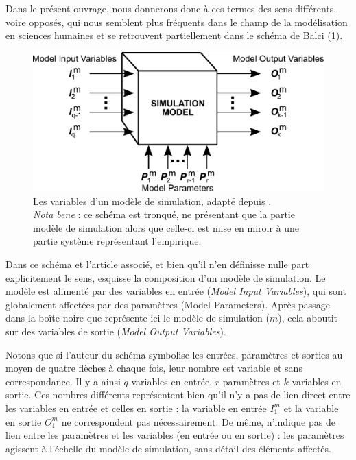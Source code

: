 Dans le présent ouvrage, nous donnerons donc à ces termes des sens différents, voire opposés, qui nous semblent plus fréquents dans le champ de la modélisation en sciences humaines et se retrouvent partiellement dans le schéma de Balci (\cref{fig:parametres-Balci}).
\begin{figure}[!h]
	\centering
	\includegraphics[width=.8\linewidth]{img/schema_parametres_balci.pdf}
	\caption[Les variables d'un modèle de simulation selon \citeauthor{balci_validation_1994}]{Les variables d'un modèle de simulation, adapté depuis \textcite[122]{balci_validation_1994}.\\
		\textit{Nota bene} : ce schéma est tronqué, ne présentant que la partie \og modèle de simulation\fg{} alors que celle-ci est mise en miroir à une partie \og système\fg{} représentant l'empirique.}
	\label{fig:parametres-Balci} 
\end{figure}

Dans ce schéma et l'article associé, et bien qu'il n'en définisse nulle part explicitement le sens, \citeauthor{balci_validation_1994} esquisse la composition d'un modèle de simulation.
Le modèle est alimenté par des variables en entrée (\textit{Model Input Variables}), qui sont globalement affectées par des paramètres (Model Parameters).
Après passage dans la \og boîte noire\fg{} que représente ici le modèle de simulation ($m$), cela aboutit sur des variables de sortie (\textit{Model Output Variables}).

Notons que si l'auteur du schéma symbolise les entrées, paramètres et sorties au moyen de quatre flèches à chaque fois, leur nombre est variable et sans correspondance.
Il y a ainsi $q$ variables en entrée, $r$ paramètres et $k$ variables en sortie.
Ces nombres différents représentent bien qu'il n'y a pas de lien direct entre les variables en entrée et celles en sortie : la variable en entrée $I_{1}^m$ et la variable en sortie $O_{1}^m$ ne correspondent pas nécessairement.
De même, \citeauthor{balci_validation_1994} n'indique pas de lien entre les paramètres et les variables (en entrée ou en sortie) : les paramètres agissent à l'échelle du modèle de simulation, sans détail des éléments affectés.

